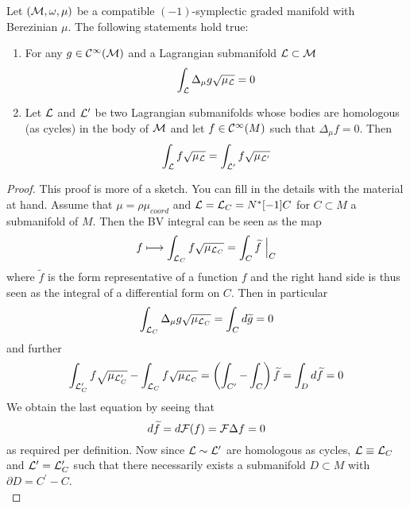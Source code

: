 \begin{theo}
  Let $(\mathcal{M}, \omega, \mu)$ be a compatible $(-1)$-symplectic graded manifold with Berezinian $\mu$. The following statements hold true:
  \begin{enumerate}
    \item For any $g \in \mathcal{C}^{\infty}(\mathcal{M})$ and a Lagrangian submanifold $\mathcal{L} \subset \mathcal{M}$
    \begin{equation}
      \int_{\mathcal{L}} \Delta_\mu g \sqrt{\mu_{\mathcal{L}}} = 0
    \end{equation}

    \item Let $\mathcal{L}$ and $\mathcal{L}^\prime$ be two Lagrangian submanifolds whose bodies are homologous (as cycles) in the body of $\mathcal{M}$ and let $f \in \mathcal{C}^{\infty}(M)$ such that $\Delta_\mu f = 0$. Then
    \begin{equation}
      \int_{\mathcal{L}} f \sqrt{\mu_{\mathcal{L}}} = \int_{\mathcal{L}^\prime} f \sqrt{\mu_{\mathcal{L}^\prime}}
    \end{equation}
  \end{enumerate}
\begin{proof}
  This proof is more of a sketch. You can fill in the details with the material at hand. Assume that $\mu = \rho \mu_{coord}$ and $\mathcal{L} = \mathcal{L}_C = N^*[-1]C$ for $C \subset M$ a submanifold of $M$. Then the BV integral can be seen as the map
  \begin{equation}
    f \longmapsto \int_{\mathcal{L}_C} f \sqrt{\mu_{\mathcal{L}_C}} = \int_C \widetilde{f}\ \Big|_C
  \end{equation}
  where $\widetilde{f}$ is the form representative of a function $f$ and the right hand side is thus seen as the integral of a differential form on $C$. Then in particular
  \begin{equation}
    \int_{\mathcal{L}_C} \Delta_\mu g \sqrt{\mu_{\mathcal{L}_C}} = \int_C d\widetilde{g} = 0
  \end{equation}
  and further
  \begin{equation}
    \int_{\mathcal{L}^\prime_C} f \sqrt{\mu_{\mathcal{L}^\prime_C}} - \int_{\mathcal{L}_C} f \sqrt{\mu_{\mathcal{L}_C}} = \left( \int_{C^\prime} - \int_{C} \right) \widetilde{f} = \int_D d\widetilde{f} = 0
  \end{equation}
  We obtain the last equation by seeing that
  \begin{equation}
    d \widetilde{f} = d {\mathcal{F}}(f) = {\mathcal{F}} \Delta f = 0
  \end{equation}
  as required per definition. Now since $\mathcal{L} \sim \mathcal{L}^\prime$ are homologous as cycles, $\mathcal{L} \equiv \mathcal{L}_C$ and $\mathcal{L}^\prime = \mathcal{L}^\prime_C$ such that there necessarily exists a submanifold $D \subset M$ with $\partial D = C^\prime - C$.\\


\end{proof}
\end{theo}
